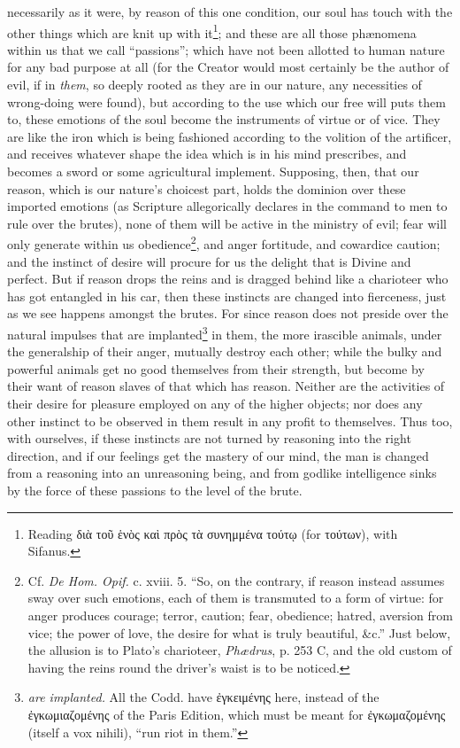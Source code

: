 necessarily as it were, by reason of this one condition, our soul has touch with the other things which are knit up with it\footnote{Reading \textgreek{διὰ τοῦ ἑνὸς καὶ πρὸς τὰ συνημμένα τούτῳ} (for \textgreek{τούτων}), with Sifanus.}; and these are all those phænomena within us that we call “passions”; which have not been allotted to human nature for any bad purpose at all (for the Creator would most certainly be the author of evil, if in \emph{them}, so deeply rooted as they are in our nature, any necessities of wrong-doing were found), but according to the use which our free will puts them to, these emotions of the soul become the instruments of virtue or of vice. They are like the iron which is being fashioned according to the volition of the artificer, and receives whatever shape the idea which is in his mind prescribes, and becomes a sword or some agricultural implement. Supposing, then, that our reason, which is our nature’s choicest part, holds the dominion over these imported emotions (as Scripture allegorically declares in the command to men to rule over the brutes), none of them will be active in the ministry of evil; fear will only generate within us obedience\footnote{Cf. \emph{De Hom. Opif.} c. xviii. 5. “So, on the contrary, if reason instead assumes sway over such emotions, each of them is transmuted to a form of virtue: for anger produces courage; terror, caution; fear, obedience; hatred, aversion from vice; the power of love, the desire for what is truly beautiful, \&c.” Just below, the allusion is to Plato’s charioteer, \emph{Phædrus}, p. 253 C, and the old custom of having the reins round the driver’s waist is to be noticed.}, and anger fortitude, and cowardice caution; and the instinct of desire will procure for us the delight that is Divine and perfect. But if reason drops the reins and is dragged behind like a charioteer who has got entangled in his car, then these instincts are changed into fierceness, just as we see happens amongst the brutes. For since reason does not preside over the natural impulses that are implanted\footnote{\emph{are implanted.} All the Codd. have \textgreek{ἐγκειμένης} here, instead of the \textgreek{ἐγκωμιαζομένης} of the Paris Edition, which must be meant for \textgreek{ἐγκωμαζομένης} (itself a vox nihili), “run riot in them.”} in them, the more irascible animals, under the generalship of their anger, mutually destroy each other; while the bulky and powerful animals get no good themselves from their strength, but become by their want of reason slaves of that which has reason. Neither are the activities of their desire for pleasure employed on any of the higher objects; nor does any other instinct to be observed in them result in any profit to themselves. Thus too, with ourselves, if these instincts are not turned by reasoning into the right direction, and if our feelings get the mastery of our mind, the man is changed from a reasoning into an unreasoning being, and from godlike intelligence sinks by the force of these passions to the level of the brute.


